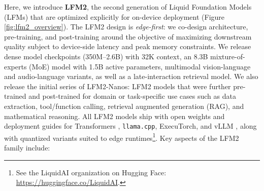 \documentclass{article}
\begin{document}
Here, we introduce \textbf{LFM2}, the second generation of Liquid Foundation Models (LFMs) that are optimized explicitly for on-device deployment (Figure \ref{fig:lfm2_overview}). The LFM2 design is \emph{edge-first}: we co-design architecture, pre-training, and post-training around the objective of maximizing downstream quality subject to device-side latency and peak memory constraints. We release dense model checkpoints (\mbox{350M–2.6B}) with 32K context, an 8.3B mixture-of-experts (MoE) model with 1.5B active parameters, multimodal vision-language and audio-language variants, as well as a late-interaction retrieval model. We also release the initial series of LFM2-Nanos: LFM2 models that were further pre-trained and post-trained for domain or task-specific use cases such as data extraction, tool/function calling, retrieval augmented generation (RAG), and mathematical reasoning. All LFM2 models ship with open weights and deployment guides for Transformers \citep{wolf2020transformers}, \texttt{llama.cpp}, ExecuTorch, and vLLM \citep{kwon2023efficient}, along with quantized variants suited to edge runtimes\footnote{See the LiquidAI organization on Hugging Face: \url{https://huggingface.co/LiquidAI}.}. 
%
Key aspects of the LFM2 family include:
%
\end{document}
